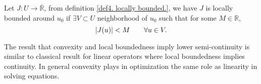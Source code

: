 \begin{remark}
	Let $J:U\rightarrow \overline{\mathbb{R}}$, from definition \ref{def4. locally bounded.},  we have $J$ is locally bounded around $u_0$ if $\exists V\subset U$ neighborhood of $u_0$ such that for some $M \in \mathbb{R}$,
	\[
		\left|J(u)\right| < M \qquad \forall u \in V.
	\]
\end{remark}
%		
%		
\begin{lemma}

\end{lemma}
\begin{remark}
	The result that convexity and local boundedness imply lower semi-continuity is similar to classical result for linear operators where local boundedness implies continuity. In general convexity plays in optimization the same role as linearity in solving equations.
\end{remark}